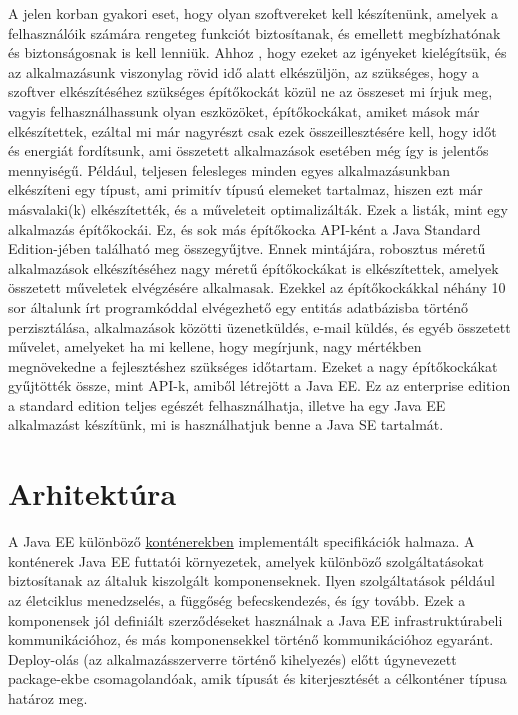 \documentclass[centeredchapter]{thesis-ekf}
\theoremstyle{definition}
\theoremstyle{remark}
\begin{document}
A jelen korban gyakori eset, hogy olyan szoftvereket kell készítenünk, amelyek a felhasználóik számára rengeteg funkciót biztosítanak, és emellett megbízhatónak és biztonságosnak is kell lenniük. Ahhoz , hogy ezeket az igényeket kielégítsük, és az alkalmazásunk viszonylag rövid idő alatt elkészüljön, az szükséges, hogy a szoftver elkészítéséhez szükséges építőkockát közül ne az összeset mi írjuk meg, vagyis felhasználhassunk olyan eszközöket, építőkockákat, amiket mások már elkészítettek, ezáltal mi már nagyrészt csak ezek összeillesztésére kell, hogy időt és energiát fordítsunk, ami összetett alkalmazások esetében még így is jelentős mennyiségű. 
Például, teljesen felesleges minden egyes alkalmazásunkban elkészíteni egy típust, ami primitív típusú elemeket tartalmaz, hiszen ezt már másvalaki(k) elkészítették, és a műveleteit optimalizálták. Ezek a listák, mint egy alkalmazás építőkockái. Ez, és sok más építőkocka API-ként a Java Standard Edition-jében található meg összegyűjtve.
Ennek mintájára, robosztus méretű alkalmazások elkészítéséhez nagy méretű építőkockákat is elkészítettek, amelyek összetett műveletek elvégzésére alkalmasak. Ezekkel az építőkockákkal néhány 10 sor általunk írt programkóddal elvégezhető egy entitás adatbázisba történő perzisztálása, alkalmazások közötti üzenetküldés, e-mail küldés, és egyéb összetett művelet, amelyeket ha mi kellene, hogy megírjunk, nagy mértékben megnövekedne a fejlesztéshez szükséges időtartam.
Ezeket a nagy építőkockákat gyűjtötték össze, mint API-k, amiből létrejött a Java EE.
Ez az enterprise edition a standard edition teljes egészét felhasználhatja, illetve ha egy Java EE alkalmazást készítünk, mi is használhatjuk benne a Java SE tartalmát.\cite{BJEE}

\section{Arhitektúra}

A Java EE különböző \hyperlink{figure-kontenerek}{konténerekben} implementált specifikációk halmaza. A konténerek Java EE futtatói környezetek, amelyek különböző szolgáltatásokat biztosítanak az általuk kiszolgált komponenseknek. Ilyen szolgáltatások például az életciklus menedzselés, a függőség befecskendezés, és így tovább. Ezek a komponensek jól definiált szerződéseket használnak a Java EE infrastruktúrabeli kommunikációhoz, és más komponensekkel történő kommunikációhoz egyaránt. Deploy-olás (az alkalmazásszerverre történő kihelyezés) előtt úgynevezett package-ekbe csomagolandóak, amik típusát és kiterjesztését a célkonténer típusa határoz meg.
\end{document}
